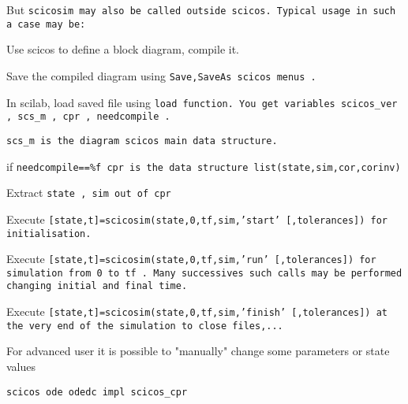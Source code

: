 But %
\tt scicosim %
\rm may also be called outside scicos. Typical usage in
such a case may be:
\begin{scitem}
\item[{\verb?1?}]
Use scicos to define a block diagram, compile it.
\item[{\verb?2?}]
Save the compiled diagram using %
\tt Save,SaveAs %
\rm scicos menus . 
\item[{\verb?3?}]
In scilab, load saved file using %
\tt load %
\rm function. You get
variables %
\tt scicos\_ver%
\rm , %
\tt scs\_m%
\rm , %
\tt cpr%
\rm ,
%
\tt needcompile%
\rm .
\end{scitem}%
\par\noindent
%
\tt scs\_m %
\rm is the diagram scicos main data structure.
\par\noindent
if %
\tt needcompile==\%f %
\rm  %
\tt cpr %
\rm is the data structure
%
\tt list(state,sim,cor,corinv) %
\rm  
\begin{scitem}
\item[{\verb?4?}]
Extract %
\tt state%
\rm , %
\tt sim %
\rm out of %
\tt cpr %
\rm \item[{\verb?5?}]
Execute %
\tt [state,t]=scicosim(state,0,tf,sim,'start' [,tolerances]) %
\rm for initialisation.
\item[{\verb?6?}]
Execute %
\tt [state,t]=scicosim(state,0,tf,sim,'run' [,tolerances]) %
\rm for simulation from %
\tt 0 %
\rm to %
\tt tf%
\rm . Many successives such calls may be
performed changing initial and final time.
\item[{\verb?7?}]
Execute %
\tt [state,t]=scicosim(state,0,tf,sim,'finish' [,tolerances]) %
\rm at the very end of the simulation to close files,...

For advanced user it is possible to "manually" change some parameters
or state values

\end{scitem}%
{\verb?scicos ode odedc impl scicos_cpr?} \pageref{scicosodeodedcimplscicoscpr}
      











%
%


